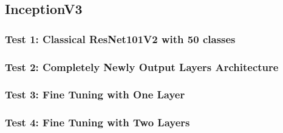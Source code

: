 \subsection{InceptionV3}

\subsubsection{Test 1: Classical ResNet101V2 with 50 classes}

\subsubsection{Test 2: Completely Newly Output Layers Architecture}

\subsubsection{Test 3: Fine Tuning with One Layer}

\subsubsection{Test 4: Fine Tuning with Two Layers}


